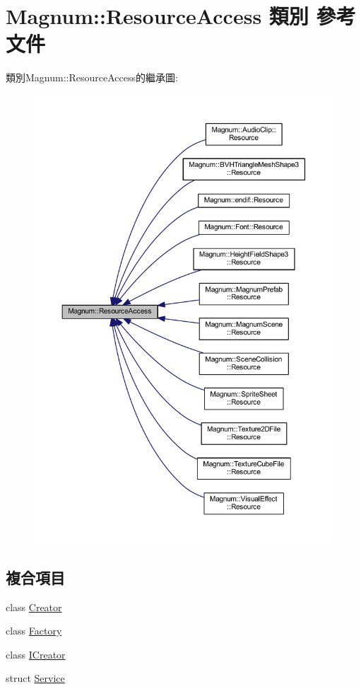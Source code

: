 \hypertarget{class_magnum_1_1_resource_access}{}\section{Magnum\+:\+:Resource\+Access 類別 參考文件}
\label{class_magnum_1_1_resource_access}


類別\+Magnum\+:\+:Resource\+Access的繼承圖\+:\nopagebreak
\begin{figure}[H]
\begin{center}
\leavevmode
\includegraphics[width=350pt]{class_magnum_1_1_resource_access__inherit__graph}
\end{center}
\end{figure}
\subsection*{複合項目}
\begin{DoxyCompactItemize}
\item 
class \hyperlink{class_magnum_1_1_resource_access_1_1_creator}{Creator}
\item 
class \hyperlink{class_magnum_1_1_resource_access_1_1_factory}{Factory}
\item 
class \hyperlink{class_magnum_1_1_resource_access_1_1_i_creator}{I\+Creator}
\item 
struct \hyperlink{struct_magnum_1_1_resource_access_1_1_service}{Service}
\end{DoxyCompactItemize}

